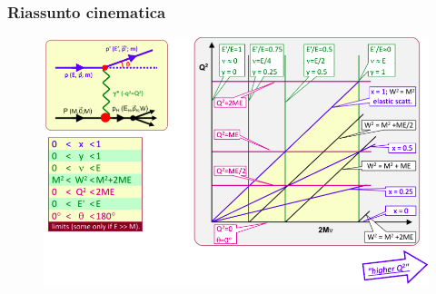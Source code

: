 \subsubsection{Riassunto cinematica}
\begin{figure}[H]
    \centering
    \includegraphics[width=\textwidth]{immagini/fig_kin_summary_hadron.png}
\end{figure}
